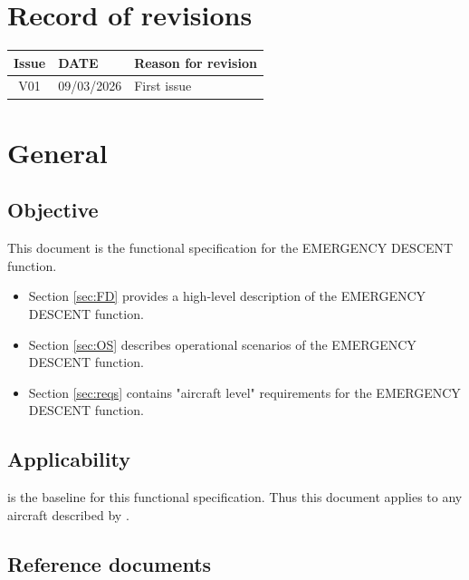 \documentclass[12pt,oneside]{scrreprt}
\begin{document}
\chapter{Record of revisions}

\begin{table}[h]
    \centering
    \begin{tabularx}{\textwidth}{|c|X|X|}
		\hline
		\textbf{Issue} & \textbf{DATE} & \textbf{Reason for revision} \\
		\hline
		V01 & 09/03/2026 & First issue \\
		\hline
	\end{tabularx}
\end{table}

\chapter{General}

\section{Objective}

This document is the functional specification for the EMERGENCY DESCENT function.
\begin{itemize}
	\item Section \ref{sec:FD} provides a high-level description of the EMERGENCY DESCENT function. 
	\item Section \ref{sec:OS} describes operational scenarios of the EMERGENCY DESCENT function. 
	\item Section \ref{sec:reqs} contains "aircraft level" requirements for the EMERGENCY DESCENT function. 
\end{itemize}

\section{Applicability}

\cite{BAD} is the baseline for this functional specification. Thus this document applies to any aircraft described by \cite{BAD}.

\section{Reference documents}
\end{document}
